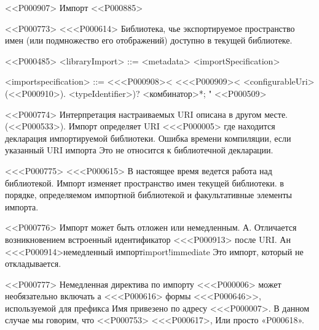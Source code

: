 <<P000907> Импорт
<<P000885>

<<P000773>%
<<<P000614> Библиотека, чье экспортируемое пространство имен
(или подмножество его отображений) доступно в текущей библиотеке.

<<P000485>
<libraryImport> ::= <metadata> <importSpecification>

<importspecification> ::= <<<P000908><
<<<P000909>< <configurableUri>
(<<P000910>). \AS{} <typeIdentifier>)?
<комбинатор>*; "
<<P000509>

<<P000774>%
Интерпретация настраиваемых URI описана в другом месте.
(<<P000533>).
Импорт определяет URI <<<P000005>
где находится декларация импортируемой библиотеки.
Ошибка времени компиляции, если указанный URI импорта
Это не относится к библиотечной декларации.

<<<P000775>%
<<<P000615> В настоящее время ведется работа над библиотекой.
Импорт изменяет пространство имен текущей библиотеки.
в порядке, определяемом импортной библиотекой и
факультативные элементы импорта.

<<P000776>%
Импорт может быть отложен или немедленным.
А.
Отличается возникновением
встроенный идентификатор <<<P000913>{} после URI.
Ан
<<<P000914>{немедленный импорт}{import!immediate}
Это импорт, который не откладывается.

<<P000777>%
Немедленная директива по импорту <<<P000006> может необязательно включать
а <<<P000616> формы <<<P000646>>, используемой для префикса
Имя привезено по адресу <<<P000007>.
В данном случае мы говорим, что <<P000753> <<<P000617>,
Или просто «P000618».

